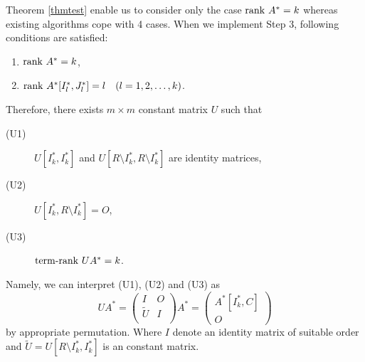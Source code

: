 Theorem \ref{thmtest} enable us to consider only the case $ \mathrm{rank} \  A^{\ast} = k $ 
whereas existing algorithms cope with 4 cases.
When we implement Step 3, following conditions are satisfied:
\begin{enumerate}
\item $ \mathrm{rank} \  A^{\ast} = k $,
\item $ \mathrm{rank} \  A^{\ast} [I^{\ast}_l, J^{\ast}_l] = l \quad ( l = 1 ,2 , \dots ,k)$.
\end{enumerate}
Therefore, there exists $ m \times m $ constant matrix $ U $ such that
\begin{description}
\item[(U1)] $ U[I^{\ast}_k,I^{\ast}_k]$ and $ U [R \setminus I^{\ast}_k, R \setminus I^{\ast}_k]$ are identity matrices,
\item[(U2)] $ U[I^{\ast}_k,R \setminus I^{\ast}_k] = O $,
\item[(U3)] $ \mathrm{term}\mbox{-}\mathrm{rank} \  U A^{\ast} = k$.
\end{description}
Namely, we can interpret (U1), (U2) and (U3) as
\[ U A^{\ast} = \left( \begin{array}{cc} I & O \\ \tilde{U} & I \\ \end{array} \right) A^{\ast} = \left( \begin{array}{c} A^{\ast} [I^{\ast}_k,C] \\ O \end{array} \right) \]
by appropriate permutation. 
Where $I$ denote an identity matrix of suitable order 
and $ \tilde{U} = U[R \setminus I^{\ast}_k,I^{\ast}_k] $ is an constant matrix. 

